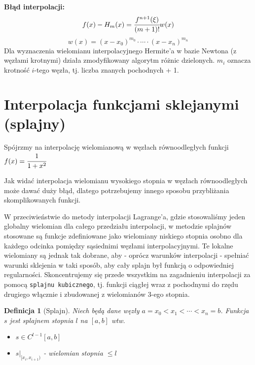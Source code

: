 \documentclass[hidelinks,a4paper,fleqn,oneside]{book}
\newtheorem{defi}{Definicja}
\begin{document}
\textbf{Błąd interpolacji:}
\[
f(x) - H_m(x) = \cfrac{f^{n+1}(\xi)}{(m+1)!}w(x)
\]
\[
	w(x) = (x-x_0)^{m_0} \cdot \cdots \cdot (x - x_n)^{m_n}
\]
Dla wyznaczenia wielomianu interpolacyjnego Hermite'a w bazie Newtona (z węzłami krotnymi) działa zmodyfikowany algorytm różnic dzielonych. $m_i$ oznacza krotność $i$-tego węzła, tj. liczba znanych pochodnych + 1.

\section{Interpolacja funkcjami sklejanymi (splajny)}
Spójrzmy na interpolację wielomianową w węzłach równoodległych funkcji $f(x) = \cfrac{1}{1+x^2}$


Jak widać interpolacja wielomianu wysokiego stopnia w węzłach równoodległych może dawać duży błąd, dlatego potrzebujemy innego sposobu przybliżania skomplikowanych funkcji.

W przeciwieństwie do metody interpolacji Lagrange'a, gdzie stosowaliśmy jeden globalny wielomian dla całego przedziału interpolacji, w metodzie splajnów stosowane są funkcje zdefiniowane jako wielomiany niskiego stopnia osobno dla każdego odcinka pomiędzy sąsiednimi węzłami interpolacyjnymi. Te lokalne wielomiany są jednak tak dobrane, aby - oprócz warunków interpolacji - spełniać warunki sklejenia w taki sposób, aby cały splajn był funkcją o odpowiedniej regularności. Skoncentrujemy się przede wszystkim na zagadnieniu interpolacji za pomocą \texttt{splajnu kubicznego}, tj. funkcji ciągłej wraz z pochodnymi do rzędu drugiego włącznie i zbudowanej z wielomianów 3-ego stopnia. 

\begin{defi}[Splajn] Niech będą dane węzły $a = x_0 < x_1 < \cdots < x_n = b$. Funkcja $s$ jest splajnem stopnia $l$ na $[a, b]$ wtw. \begin{itemize}
\item $s \in C^{l-1}[a, b]$
\item $s|_{[x_i, x_{i+1})}$ - wielomian stopnia $\leq l$
\end{itemize}
\end{defi}
\end{document}
